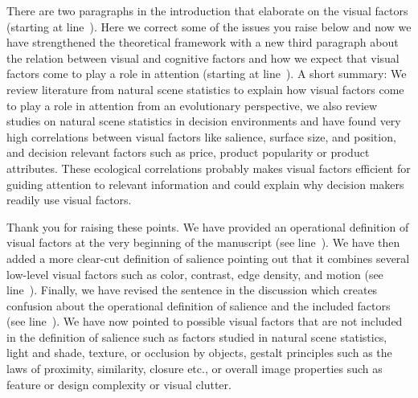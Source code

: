 
There are two paragraphs in the introduction that elaborate on the visual factors (starting at line~). Here we correct some of the issues you raise below and now we have strengthened the theoretical framework with a new third paragraph about the relation between visual and cognitive factors and how we expect that visual factors come to play a role in attention (starting at line~). A short summary: We review literature from natural scene statistics to explain how visual factors come to play a role in attention from an evolutionary perspective, we also review studies on natural scene statistics in decision environments and have found very high correlations between visual factors like salience, surface size, and position, and decision relevant factors such as price, product popularity or product attributes. These ecological correlations probably makes visual factors efficient for guiding attention to relevant information and could explain why decision makers readily use visual factors.   



Thank you for raising these points. We have provided an operational definition of visual factors at the very beginning of the manuscript (see line~). We have then added a more clear-cut definition of salience pointing out that it combines several low-level visual factors such as color, contrast, edge density, and motion (see line~). Finally, we have revised the sentence in the discussion which creates confusion about the operational definition of salience and the included factors (see line~). We have now pointed to possible visual factors that are not included in the definition of salience such as factors studied in natural scene statistics, light and shade, texture, or occlusion by objects, gestalt principles such as the laws of proximity, similarity, closure etc., or overall image properties such as feature or design complexity or visual clutter. 


